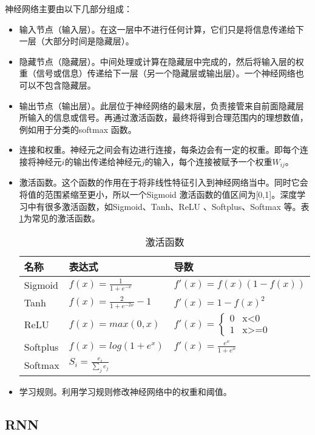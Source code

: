 神经网络主要由以下几部分组成：
\begin{itemize}
    \item 输入节点（输入层）。在这一层中不进行任何计算，它们只是将信息传递给下一层（大部分时间是隐藏层）。
    \item 隐藏节点（隐藏层）。中间处理或计算在隐藏层中完成的，然后将输入层的权重（信号或信息）传递给下一层（另一个隐藏层或输出层）。一个神经网络也可以不包含隐藏层。
    \item 输出节点（输出层）。此层位于神经网络的最末层，负责接管来自前面隐藏层所输入的信息或信号。再通过激活函数，最终将得到合理范围内的理想数值，例如用于分类的softmax 函数。
    \item 连接和权重。神经元之间会有边进行连接，每条边会有一定的权重。即每个连接将神经元$i$的输出传递给神经元$j$的输入，每个连接被赋予一个权重$W_{ij}$。
    \item 激活函数。这个函数的作用在于将非线性特征引入到神经网络当中。同时它会将值的范围紧缩至更小，所以一个Sigmoid 激活函数的值区间为[0,1]。深度学习中有很多激活函数，如Sigmoid、Tanh、ReLU 、Softplus、Softmax 等。表\ref{table:激活函数}为常见的激活函数。
    \begin{table}[]
        \caption{激活函数}
        \label{table:激活函数}
        \centering
        \begin{tabular}{|l|l|l|}
        \hline
        名称&表达式&导数\\ \hline
        Sigmoid &  $f(x) = \frac{1}{1+e^{-x}}$ & $f'(x) = f(x)(1-f(x))$
        \\ \hline
        Tanh & $f(x) = \frac{2}{1+e^{-2x}} - 1$ & $f'(x) = 1 - f(x)^2$ \\ \hline
        ReLU & $f(x) = max(0, x)$ & $f'(x)=\begin{cases}
        0& \text{x<0}\\
        1& \text{x>=0}
        \end{cases}$ \\ \hline
        Softplus & $f(x) = log(1+e^x)$ & $f'(x) = \frac{e^x}{1+e^x}$ \\ \hline
        Softmax & $S_i = \frac{e_i}{\sum_j e_j}$ & \\ \hline
        \end{tabular}
        \end{table}
    \item 学习规则。利用学习规则修改神经网络中的权重和阈值。
\end{itemize}

\subsection{RNN}

